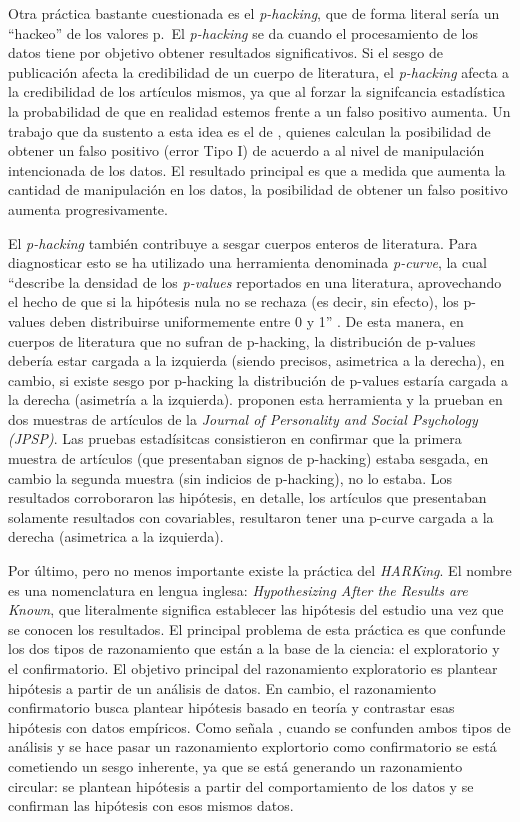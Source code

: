 \documentclass[
]{book}
\begin{document}
Otra práctica bastante cuestionada es el \emph{p-hacking}, que de forma literal sería un ``hackeo'' de los valores p.~El \emph{p-hacking} se da cuando el procesamiento de los datos tiene por objetivo obtener resultados significativos. Si el sesgo de publicación afecta la credibilidad de un cuerpo de literatura, el \emph{p-hacking} afecta a la credibilidad de los artículos mismos, ya que al forzar la signifcancia estadística la probabilidad de que en realidad estemos frente a un falso positivo aumenta. Un trabajo que da sustento a esta idea es el de \citet{simmons_FalsePositive_2011}, quienes calculan la posibilidad de obtener un falso positivo (error Tipo I) de acuerdo a al nivel de manipulación intencionada de los datos. El resultado principal es que a medida que aumenta la cantidad de manipulación en los datos, la posibilidad de obtener un falso positivo aumenta progresivamente.

El \emph{p-hacking} también contribuye a sesgar cuerpos enteros de literatura. Para diagnosticar esto se ha utilizado una herramienta denominada \emph{p-curve}, la cual ``describe la densidad de los \emph{p-values} reportados en una literatura, aprovechando el hecho de que si la hipótesis nula no se rechaza (es decir, sin efecto), los p-values deben distribuirse uniformemente entre 0 y 1'' \citep[p.67.]{christensen_Transparent_2019}. De esta manera, en cuerpos de literatura que no sufran de p-hacking, la distribución de p-values debería estar cargada a la izquierda (siendo precisos, asimetrica a la derecha), en cambio, si existe sesgo por p-hacking la distribución de p-values estaría cargada a la derecha (asimetría a la izquierda). \citet{simonsohn_Pcurve_2014} proponen esta herramienta y la prueban en dos muestras de artículos de la \emph{Journal of Personality and Social Psychology (JPSP)}. Las pruebas estadísitcas consistieron en confirmar que la primera muestra de artículos (que presentaban signos de p-hacking) estaba sesgada, en cambio la segunda muestra (sin indicios de p-hacking), no lo estaba. Los resultados corroboraron las hipótesis, en detalle, los artículos que presentaban solamente resultados con covariables, resultaron tener una p-curve cargada a la derecha (asimetrica a la izquierda).

Por último, pero no menos importante existe la práctica del \emph{HARKing}. El nombre es una nomenclatura en lengua inglesa: \emph{Hypothesizing After the Results are Known}, que literalmente significa establecer las hipótesis del estudio una vez que se conocen los resultados. El principal problema de esta práctica es que confunde los dos tipos de razonamiento que están a la base de la ciencia: el exploratorio y el confirmatorio. El objetivo principal del razonamiento exploratorio es plantear hipótesis a partir de un análisis de datos. En cambio, el razonamiento confirmatorio busca plantear hipótesis basado en teoría y contrastar esas hipótesis con datos empíricos. Como señala \citet{nosek_preregistration_2018}, cuando se confunden ambos tipos de análisis y se hace pasar un razonamiento explortorio como confirmatorio se está cometiendo un sesgo inherente, ya que se está generando un razonamiento circular: se plantean hipótesis a partir del comportamiento de los datos y se confirman las hipótesis con esos mismos datos.
\end{document}
